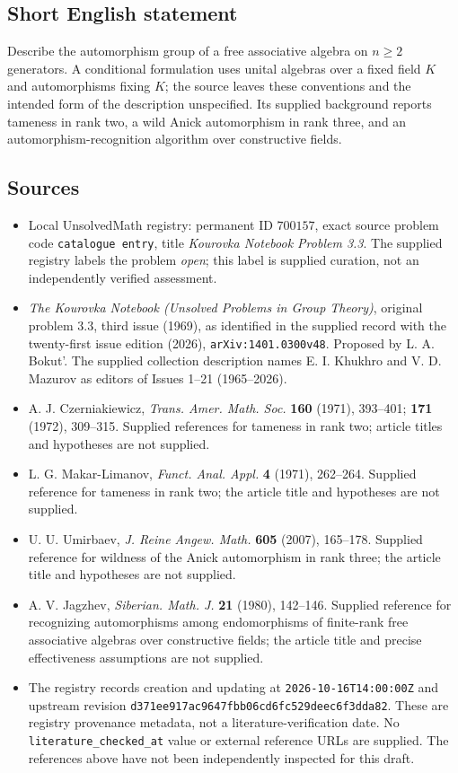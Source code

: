 \documentclass[11pt]{article}
\begin{document}
\subsection{Short English statement}
Describe the automorphism group of a free associative algebra on \(n\geq 2\) generators. A conditional formulation uses unital algebras over a fixed field \(K\) and automorphisms fixing \(K\); the source leaves these conventions and the intended form of the description unspecified. Its supplied background reports tameness in rank two, a wild Anick automorphism in rank three, and an automorphism-recognition algorithm over constructive fields.
\subsection{Sources}
\begin{itemize}
\item Local UnsolvedMath registry: permanent ID \(700157\), exact source problem code \texttt{catalogue entry}, title \emph{Kourovka Notebook Problem 3.3}. The supplied registry labels the problem \emph{open}; this label is supplied curation, not an independently verified assessment.
\item \emph{The Kourovka Notebook (Unsolved Problems in Group Theory)}, original problem 3.3, third issue (1969), as identified in the supplied record with the twenty-first issue edition (2026), \texttt{arXiv:1401.0300v48}. Proposed by L. A. Bokut'. The supplied collection description names E. I. Khukhro and V. D. Mazurov as editors of Issues 1--21 (1965--2026).
\item A. J. Czerniakiewicz, \emph{Trans. Amer. Math. Soc.} \textbf{160} (1971), 393--401; \textbf{171} (1972), 309--315. Supplied references for tameness in rank two; article titles and hypotheses are not supplied.
\item L. G. Makar-Limanov, \emph{Funct. Anal. Appl.} \textbf{4} (1971), 262--264. Supplied reference for tameness in rank two; the article title and hypotheses are not supplied.
\item U. U. Umirbaev, \emph{J. Reine Angew. Math.} \textbf{605} (2007), 165--178. Supplied reference for wildness of the Anick automorphism in rank three; the article title and hypotheses are not supplied.
\item A. V. Jagzhev, \emph{Siberian. Math. J.} \textbf{21} (1980), 142--146. Supplied reference for recognizing automorphisms among endomorphisms of finite-rank free associative algebras over constructive fields; the article title and precise effectiveness assumptions are not supplied.
\item The registry records creation and updating at \texttt{2026-10-16T14:00:00Z} and upstream revision \texttt{d371ee917ac9647fbb06cd6fc529deec6f3dda82}. These are registry provenance metadata, not a literature-verification date. No \texttt{literature\_checked\_at} value or external reference URLs are supplied. The references above have not been independently inspected for this draft.
\end{itemize}
\end{document}
